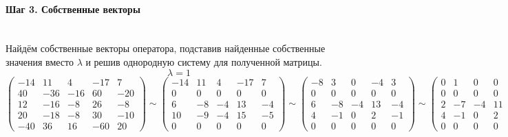 \documentclass{article}
\newcommand{\la}{\lambda}
\begin{document}
\paragraph*{Шаг 3. Собственные векторы} \, \\
Найдём собственные векторы оператора, подставив найденные собственные значения вместо $\la$ и решив однородную систему для полученной матрицы.
$$\la = 1$$
$$\begin{pmatrix}
-14 & 11 & 4 & -17 & 7 \\
40 & -36 & -16 & 60 & -20 \\
12 & -16 & -8 & 26 & -8 \\
20 & -18 & -8 & 30 & -10 \\
-40 & 36 & 16 & -60 & 20
\end{pmatrix} \sim \begin{pmatrix}
-14 & 11 & 4 & -17 & 7 \\
0 & 0 & 0 & 0 & 0 \\
6 & -8 & -4 & 13 & -4 \\
10 & -9 & -4 & 15 & -5 \\
0 & 0 & 0 & 0 & 0
\end{pmatrix} \sim \begin{pmatrix}
-8 & 3 & 0 & -4 & 3 \\
0 & 0 & 0 & 0 & 0 \\
6 & -8 & -4 & 13 & -4 \\
4 & -1 & 0 & 2 & -1 \\
0 & 0 & 0 & 0 & 0
\end{pmatrix} \sim \begin{pmatrix}
0 & 1 & 0 & 0 & 1 \\
0 & 0 & 0 & 0 & 0 \\
2 & -7 & -4 & 11 & -3 \\
4 & -1 & 0 & 2 & -1 \\
0 & 0 & 0 & 0 & 0
\end{pmatrix} \sim$$
\end{document}
